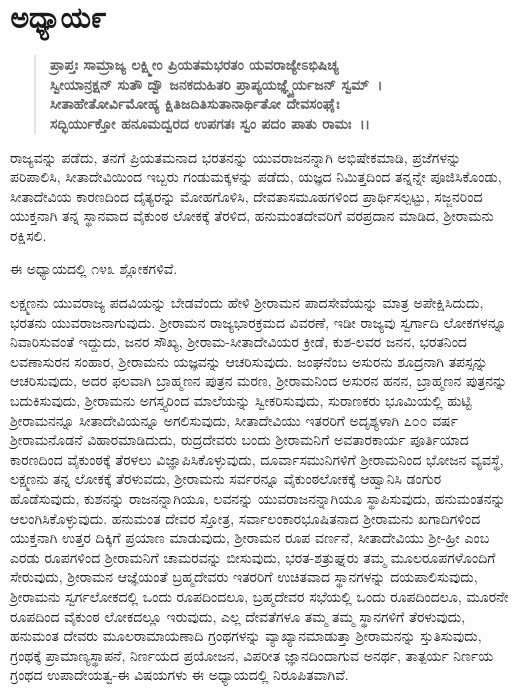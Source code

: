 \section*{ಅಧ್ಯಾಯ\enginline{-}೯}

\begin{verse}
\textbf{ಪ್ರಾಪ್ತಃ ಸಾಮ್ರಾಜ್ಯ ಲಕ್ಷ್ಮೀಂ ಪ್ರಿಯತಮಭರತಂ ಯವರಾಜ್ಯೇಽಭಿಷಿಚ್ಯ}\\\textbf{ಸ್ವೀಯಾನ್ರಕ್ಷನ್ ಸುತೌ ದ್ವೌ ಜನಕದುಹಿತರಿ ಪ್ರಾಪ್ಯಯಜ್ಞ್ಯೈರ್ಯಜನ್ ಸ್ವಮ್~।}\\\textbf{ಸೀತಾಹೇತೋರ್ವಿಮೋಹ್ಯ ಕ್ಷಿತಿಜದಿತಿಸುತಾನಾರ್ಥಿತೋ ದೇವಸಂಘೈಃ }\\\textbf{ಸದ್ಭಿರ್ಯುಕ್ತೋ ಹನೂಮದ್ವರದ ಉಪಗತಃ ಸ್ವಂ ಪದಂ ಪಾತು ರಾಮಃ~।।}
\end{verse}

ರಾಜ್ಯವನ್ನು ಪಡೆದು, ತನಗೆ ಪ್ರಿಯತಮನಾದ ಭರತನನ್ನು ಯುವರಾಜನನ್ನಾಗಿ ಅಭಿಷೇಕಮಾಡಿ, ಪ್ರಜೆಗಳನ್ನು ಪರಿಪಾಲಿಸಿ, ಸೀತಾದೇವಿಯಿಂದ ಇಬ್ಬರು ಗಂಡುಮಕ್ಕಳನ್ನು ಪಡೆದು, ಯಜ್ಞದ ನಿಮಿತ್ತದಿಂದ ತನ್ನನ್ನೇ ಪೂಜಿಸಿಕೊಂಡು, ಸೀತಾದೇವಿಯ ಕಾರಣದಿಂದ ದೈತ್ಯರನ್ನು ಮೋಹಗೊಳಿಸಿ, ದೇವತಾಸಮೂಹಗಳಿಂದ ಪ್ರಾರ್ಥಿಸಲ್ಪಟ್ಟು, ಸಜ್ಜನರಿಂದ ಯುಕ್ತನಾಗಿ ತನ್ನ ಸ್ಥಾನವಾದ ವೈಕುಂಠ ಲೋಕಕ್ಕೆ ತೆರಳಿದ, ಹನುಮಂತದೇವರಿಗೆ ವರಪ್ರದಾನ ಮಾಡಿದ, ಶ‍್ರೀರಾಮನು ರಕ್ಷಿಸಲಿ.

ಈ ಅಧ್ಯಾಯದಲ್ಲಿ ೧೪೩ ಶ್ಲೋಕಗಳಿವೆ.

ಲಕ್ಷ್ಮಣನು ಯುವರಾಜ್ಯ ಪದವಿಯನ್ನು ಬೇಡವೆಂದು ಹೇಳಿ ಶ‍್ರೀರಾಮನ ಪಾದಸೇವೆಯನ್ನು ಮಾತ್ರ ಅಪೇಕ್ಷಿಸಿದುದು, ಭರತನು ಯುವರಾಜನಾಗುವುದು. ಶ‍್ರೀರಾಮನ ರಾಜ್ಯಭಾರಕ್ರಮದ ವಿವರಣೆ, ಇಡೀ ರಾಜ್ಯವು ಸ್ವರ್ಗಾದಿ ಲೋಕಗಳನ್ನೂ ನಿವಾರಿಸುವಂತೆ ಇದ್ದುದು, ಜನರ ಸೌಖ್ಯ, ಶ‍್ರೀರಾಮ-ಸೀತಾದೇವಿಯರ ಕ್ರೀಡೆ, ಕುಶ-ಲವರ ಜನನ, ಭರತನಿಂದ ಲವಣಾಸುರನ ಸಂಹಾರ, ಶ‍್ರೀರಾಮನು ಯಜ್ಞವನ್ನು ಆಚರಿಸುವುದು. ಜಂಘನೆಂಬ ಅಸುರನು ಶೂದ್ರನಾಗಿ ತಪಸ್ಸನ್ನು ಆಚರಿಸುವುದು, ಅದರ ಫಲವಾಗಿ ಬ್ರಾಹ್ಮಣನ ಪುತ್ರನ ಮರಣ, ಶ‍್ರೀರಾಮನಿಂದ ಅಸುರನ ಹನನ, ಬ್ರಾಹ್ಮಣನ ಪುತ್ರನನ್ನು ಬದುಕಿಸುವುದು, ಶ‍್ರೀರಾಮನು ಅಗಸ್ತ್ಯರಿಂದ ಮಾಲೆಯನ್ನು ಸ್ವೀಕರಿಸುವುದು, ಸುರಾಣಕರು ಭೂಮಿಯಲ್ಲಿ ಹುಟ್ಟಿ ಶ‍್ರೀರಾಮನನ್ನೂ ಸೀತಾದೇವಿಯನ್ನೂ ಅಗಲಿಸುವುದು, ಸೀತಾದೇವಿಯು ಇತರರಿಗೆ ಅದೃಶ್ಯಳಾಗಿ ೭೦೦ ವರ್ಷ ಶ‍್ರೀರಾಮನೊಡನೆ ವಿಹಾರಮಾಡಿದುದು, ರುದ್ರದೇವರು ಬಂದು ಶ‍್ರೀರಾಮನಿಗೆ ಅವತಾರಕಾರ್ಯ ಪೂರ್ತಿಯಾದ ಕಾರಣದಿಂದ ವೈಕುಂಠಕ್ಕೆ ತೆರಳಲು ವಿಜ್ಞಾಪಿಸಿಕೊಳ್ಳುವುದು, ದೂರ್ವಾಸಮುನಿಗಳಿಗೆ ಶ‍್ರೀರಾಮನಿಂದ ಭೋಜನ ವ್ಯವಸ್ಥೆ, ಲಕ್ಷ್ಮಣನು ತನ್ನ ಲೋಕಕ್ಕೆ ತೆರಳುವದು, ಶ‍್ರೀರಾಮನು ಸರ್ವರನ್ನೂ ವೈಕುಂಠಲೋಕಕ್ಕೆ ಆಹ್ವಾನಿಸಿ ಡಂಗುರ ಹೊಡೆಸುವುದು, ಕುಶನನ್ನು ರಾಜನನ್ನಾಗಿಯೂ, ಲವನನ್ನು ಯುವರಾಜನನ್ನಾಗಿಯೂ ಸ್ಥಾಪಿಸುವುದು, ಹನುಮಂತನನ್ನು ಆಲಂಗಿಸಿಕೊಳ್ಳುವುದು. ಹನುಮಂತ ದೇವರ ಸ್ತೋತ್ರ, ಸರ್ವಾಲಂಕಾರಭೂಷಿತನಾದ ಶ‍್ರೀರಾಮನು ಖಗಾದಿಗಳಿಂದ ಯುಕ್ತನಾಗಿ ಉತ್ತರ ದಿಕ್ಕಿಗೆ ಪ್ರಯಾಣ ಮಾಡುವುದು, ಶ‍್ರೀರಾಮನ ರೂಪ ವರ್ಣನೆ, ಸೀತಾದೇವಿಯು ಶ‍್ರೀ-ಹ್ರೀ ಎಂಬ ಎರಡು ರೂಪಗಳಿಂದ ಶ‍್ರೀರಾಮನಿಗೆ ಚಾಮರವನ್ನು ಬೀಸುವುದು, ಭರತ-ಶತ್ರುಘ್ನರು ತಮ್ಮ ಮೂಲರೂಪಗಳೊಂದಿಗೆ ಸೇರುವುದು, ಶ‍್ರೀರಾಮನ ಆಜ್ಞೆಯಂತೆ ಬ್ರಹ್ಮದೇವರು ಇತರರಿಗೆ ಉಚಿತವಾದ ಸ್ಥಾನಗಳನ್ನು ದಯಪಾಲಿಸುವುದು, ಶ‍್ರೀರಾಮನು ಸ್ವರ್ಗಲೋಕದಲ್ಲಿ ಒಂದು ರೂಪದಿಂದಲೂ, ಬ್ರಹ್ಮದೇವರ ಸಭೆಯಲ್ಲಿ ಒಂದು ರೂಪದಿಂದಲೂ, ಮೂರನೇ ರೂಪದಿಂದ ವೈಕುಂಠ ಲೋಕದಲ್ಲೂ ಇರುವುದು, ಎಲ್ಲ ದೇವತೆಗಳೂ ತಮ್ಮ ತಮ್ಮ ಸ್ಥಾನಗಳಿಗೆ ತೆರಳುವುದು, ಹನುಮಂತ ದೇವರು ಮೂಲರಾಮಾಯಣಾದಿ ಗ್ರಂಥಗಳನ್ನು ವ್ಯಾಖ್ಯಾನಮಾಡುತ್ತಾ ಶ‍್ರೀರಾಮನನ್ನು ಸ್ತುತಿಸುವುದು, ಗ್ರಂಥಕ್ಕೆ ಪ್ರಾಮಾಣ್ಯಸ್ಥಾಪನೆ, ನಿರ್ಣಯದ ಪ್ರಯೋಜನ, ವಿಪರೀತ ಜ್ಞಾನದಿಂದಾಗುವ ಅನರ್ಥ, ತಾತ್ಪರ್ಯ ನಿರ್ಣಯ ಗ್ರಂಥದ ಉಪಾದೇಯತ್ವ-ಈ ವಿಷಯಗಳು ಈ ಅಧ್ಯಾಯದಲ್ಲಿ ನಿರೂಪಿತವಾಗಿವೆ.


